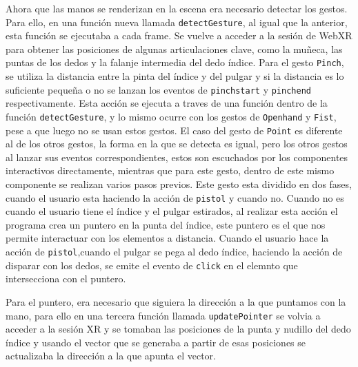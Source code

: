 \documentclass[a4paper, 12pt]{book}
\begin{document}
Ahora que las manos se renderizan en la escena era necesario detectar los gestos. Para ello, en una función nueva llamada \texttt{detectGesture}, al igual que la anterior, esta función se ejecutaba a cada frame. Se vuelve a acceder a la sesión de WebXR para obtener las posiciones de algunas articulaciones clave, como la muñeca, las puntas de los dedos y la falanje intermedia del dedo índice.
Para el gesto \texttt{Pinch}, se utiliza la distancia entre la pinta del índice y del pulgar y si la distancia es lo suficiente pequeña o no se lanzan los eventos de \texttt{pinchstart} y \texttt{pinchend} respectivamente. Esta acción se ejecuta a traves de una función dentro de la función \texttt{detectGesture}, y lo mismo ocurre con los gestos de \texttt{Openhand} y \texttt{Fist}, pese a que luego no se usan estos gestos. El caso del gesto de \texttt{Point} es diferente al de los otros gestos, la forma en la que se detecta es igual, pero los otros gestos al lanzar sus eventos correspondientes, estos son escuchados por los componentes interactivos directamente, mientras que para este gesto,
dentro de este mismo componente se realizan varios pasos previos. Este gesto esta dividido en dos fases, cuando el usuario esta haciendo la acción de \texttt{pistol} y cuando no. Cuando no es cuando el usuario tiene el índice y el pulgar estirados, al realizar esta acción el programa crea un puntero en la punta del índice, este puntero es el que nos permite interactuar con los elementos a distancia. Cuando el usuario hace la acción de \texttt{pistol},cuando el pulgar se pega al dedo índice, haciendo la acción de disparar con los dedos, se emite el evento de \texttt{click} en el elemnto que intersecciona con el puntero. 

Para el puntero, era necesario que siguiera la dirección a la que puntamos con la mano, para ello en una tercera función llamada \texttt{updatePointer} se volvia a acceder a la sesión XR y se tomaban las posiciones de la punta y nudillo del dedo índice y usando el vector que se generaba a partir de esas posiciones se actualizaba la dirección a la que apunta el vector.
\end{document}
